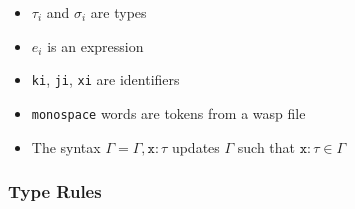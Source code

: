 \begin{itemize}
  \item $\tau_i$ and $\sigma_i$ are types
  \item $e_i$ is an expression
  \item \texttt{ki}, \texttt{ji}, \texttt{xi} are identifiers
  \item \texttt{monospace} words are tokens from a wasp file
  \item The syntax $\Gamma = \Gamma, \texttt{x} : \tau$ updates $\Gamma$ such that
        $\texttt{x} : \tau \in \Gamma$
\end{itemize}

\subsubsection{Type Rules}

